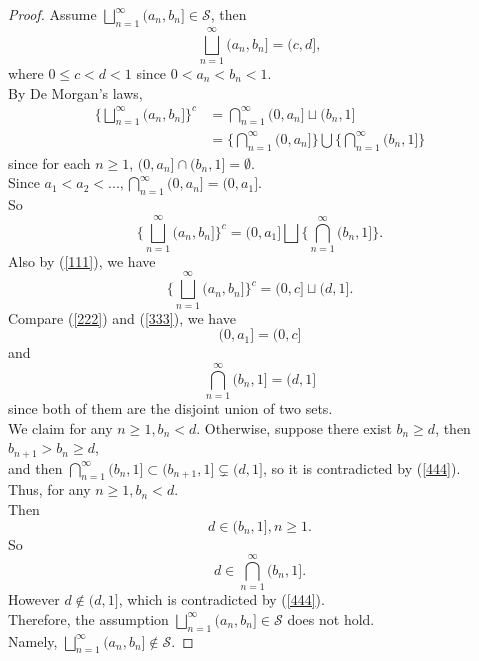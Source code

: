 \documentclass{article}
\newcommand{\lls}{\mathcal{S}}
\newcommand{\uu}{\bigsqcup_{n=1}^{\infty}(a_n,b_n]}
\begin{document}
\begin{proof}
	Assume $\uu \in \lls$, then 
	\begin{equation} \label{111}
		\uu = (c,d],
	\end{equation}
		where $0 \leq c < d < 1$ since $0 < a_n < b_n < 1$.\\
		By De Morgan\rq s laws,
		\begin{align*}
	\Bigg\{ \uu \Bigg\} ^ c &= \bigcap_{n=1}^{\infty}(0, a_{n}] \sqcup (b_n,1] \\
					 	   &= \Bigg \{\bigcap_{n=1}^{\infty}(0, a_{n}] \Bigg \} \bigcup \Bigg\{\bigcap_{n=1}^{\infty}(b_n, 1]\Bigg\}	
		\end{align*}
		since for each $n \geq 1$, $(0,a_n] \cap (b_n,1] = \emptyset$.\\
		Since $a_1 < a_2 < ..., \bigcap_{n=1}^{\infty}(0, a_{n}] = (0, a_1]$. \\
		So 
		\begin{equation}\label{222}
		\Bigg\{ \uu \Bigg\} ^ c = (0,a_1] \bigsqcup \Bigg\{\bigcap_{n=1}^{\infty}(b_n, 1]\Bigg\}.
		\end{equation}
		Also by (\ref{111}), we have
		\begin{equation}\label{333}
			\Bigg\{ \uu \Bigg\} ^ c = (0,c] \sqcup (d,1].
		\end{equation}
		Compare (\ref{222}) and (\ref{333}), we have
			$$(0,a_1] = (0,c] $$
			and 
		\begin{equation}\label{444} 
			\bigcap_{n=1}^{\infty}(b_n, 1] = (d,1] 
		\end{equation}
		since both of them are the disjoint union of two sets.\\
		We claim for any $n \geq 1, b_n < d$. Otherwise, suppose there exist $b_n \geq d$, then $b_{n+1} > b_n \geq d$,\\
		and then $\bigcap_{n=1}^{\infty}(b_n, 1] \subset (b_{n+1},1] \subsetneq (d,1]$, so it is contradicted by (\ref{444}).	\\
		Thus, for any $n \geq 1, b_n < d$.\\
		Then 
			$$d \in (b_n, 1], n \geq 1.$$
		So 
		$$ d \in \bigcap_{n=1}^{\infty}(b_n, 1].$$
	However $d \not\in (d,1]$, which is contradicted by (\ref{444}).\\
	Therefore, the assumption $\uu \in \lls$ does not hold.\\
	Namely, $\uu \not\in \lls$.

		
	

\end{proof}
\end{document}
